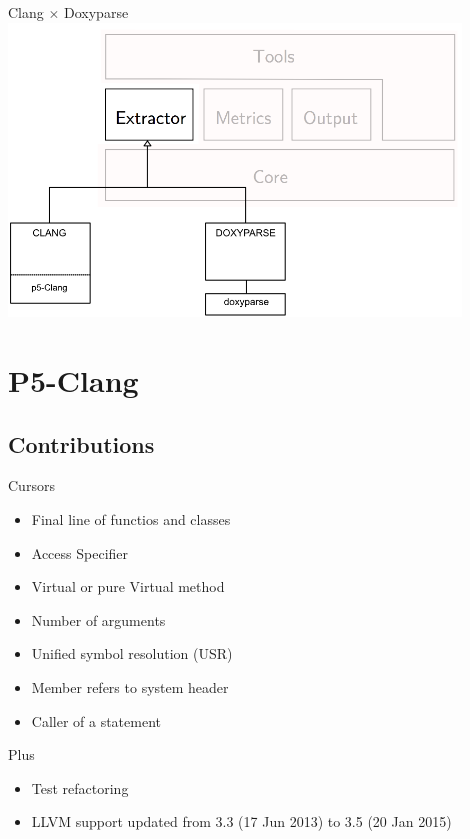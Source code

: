 \begin{frame}{Clang $\times$ Doxyparse}
    \centering
        \includegraphics[width=0.9\textwidth]{conteudo/how_it_works.png}
\end{frame}

\section{P5-Clang} %
\label{sec:p5_clang}

\subsection*{Contributions}
\begin{frame}{Cursors}
    \begin{itemize} 
        \item Final line of functios and classes  
        \item Access Specifier
        \item Virtual or pure Virtual method
        \item Number of arguments
        \item Unified symbol resolution (USR)
        \item Member refers to system header
        \item Caller of a statement 
    \end{itemize}
\end{frame}

\begin{frame}{Plus}

\begin{itemize}
    \item Test refactoring
    \item LLVM support updated from 3.3 (17 Jun 2013) to 3.5 (20 Jan 2015)
\end{itemize}
    
\end{frame}


